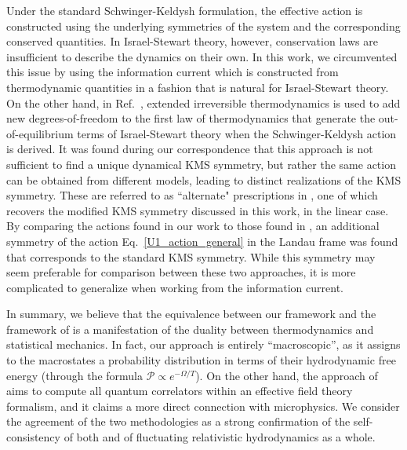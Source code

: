 \documentclass[aps,prd,nofootinbib,amsmath,amssymb,showpacs,longbibliography,singlecolumn,superscriptaddress,notitlepage]{revtex4-1}
\theoremstyle{plain}
\theoremstyle{definition}
\begin{document}
Under the standard Schwinger-Keldysh formulation, the effective action is constructed using the underlying symmetries of the system and the corresponding conserved quantities. In Israel-Stewart theory, however, conservation laws are insufficient to describe the dynamics on their own. In this work, we circumvented this issue by using the information current which is constructed from thermodynamic quantities in a fashion that is natural for Israel-Stewart theory. On the other hand, in Ref.\ \cite{JainKovtun:Placeholder}, extended irreversible thermodynamics is used to add new degrees-of-freedom to the first law of thermodynamics that generate the out-of-equilibrium terms of Israel-Stewart theory when the Schwinger-Keldysh action is derived. It was found during our correspondence that this approach is not sufficient to find a unique dynamical KMS symmetry, but rather the same action can be obtained from different models, leading to distinct realizations of the KMS symmetry. These are referred to as ``alternate" prescriptions in \cite{JainKovtun:Placeholder}, one of which recovers the modified KMS symmetry discussed in this work, in the linear case. By comparing the actions found in our work to those found in \cite{JainKovtun:Placeholder}, an additional symmetry of the action Eq.\ \eqref{U1_action_general} in the Landau frame was found that corresponds to the standard KMS symmetry. While this symmetry may seem preferable for comparison between these two approaches, it is more complicated to generalize when working from the information current.

In summary, we believe that the equivalence between our framework and the framework of \cite{JainKovtun:Placeholder} is a manifestation of the duality between thermodynamics and statistical mechanics. In fact, our approach is entirely ``macroscopic'', as it assigns to the macrostates a probability distribution in terms of their hydrodynamic free energy (through the formula $\mathcal{P}\propto e^{-\Omega/T}$). On the other hand, the approach of \cite{JainKovtun:Placeholder} aims to compute all quantum correlators within an effective field theory formalism, and it claims a more direct connection with microphysics. We consider the agreement of the two methodologies as a strong confirmation of the self-consistency of both and of fluctuating relativistic hydrodynamics as a whole.
\end{document}
